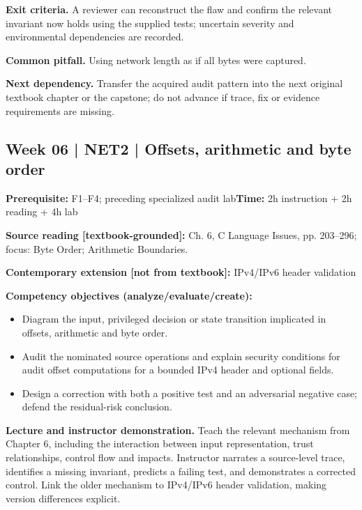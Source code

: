 \documentclass[10pt,letterpaper]{article}
\begin{document}
\textbf{Exit criteria.} A reviewer can reconstruct the flaw and confirm the relevant invariant now holds using the supplied tests; uncertain severity and environmental dependencies are recorded.

\textbf{Common pitfall.} Using network length as if all bytes were captured.

\textbf{Next dependency.} Transfer the acquired audit pattern into the next original textbook chapter or the capstone; do not advance if trace, fix or evidence requirements are missing.

\subsection{Week 06 | NET2 | Offsets, arithmetic and byte order}
\textbf{Prerequisite:} F1--F4; preceding specialized audit lab\hfill\textbf{Time:} 2h instruction + 2h reading + 4h lab

\textbf{Source reading [textbook-grounded]:} Ch. 6, C Language Issues, pp. 203--296; focus: Byte Order; Arithmetic Boundaries.

\textbf{Contemporary extension [not from textbook]:} IPv4/IPv6 header validation

\textbf{Competency objectives (analyze/evaluate/create):}
\begin{itemize}[leftmargin=*,itemsep=2pt]
\item Diagram the input, privileged decision or state transition implicated in offsets, arithmetic and byte order.
\item Audit the nominated source operations and explain security conditions for audit offset computations for a bounded IPv4 header and optional fields.
\item Design a correction with both a positive test and an adversarial negative case; defend the residual-risk conclusion.
\end{itemize}
\textbf{Lecture and instructor demonstration.} Teach the relevant mechanism from Chapter 6, including the interaction between input representation, trust relationships, control flow and impacts. Instructor narrates a source-level trace, identifies a missing invariant, predicts a failing test, and demonstrates a corrected control. Link the older mechanism to IPv4/IPv6 header validation, making version differences explicit.
\end{document}
